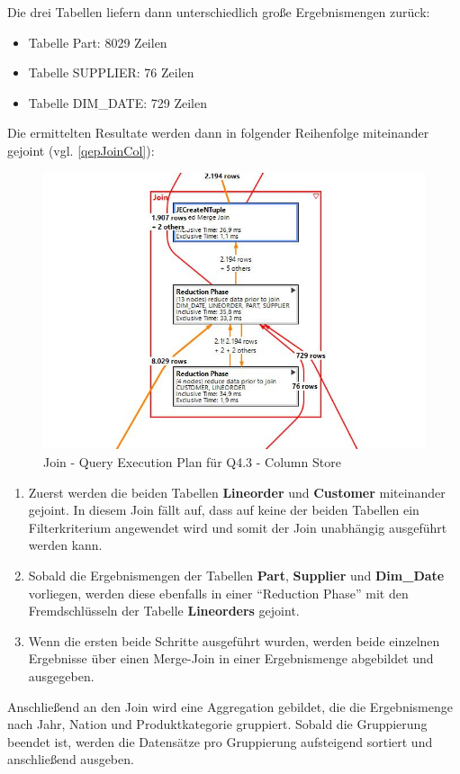 Die drei Tabellen liefern dann unterschiedlich große Ergebnismengen zurück:
\begin{itemize}
	\item Tabelle Part:			8029 Zeilen
	\item Tabelle SUPPLIER:		76 Zeilen
	\item Tabelle DIM\_DATE:	729 Zeilen
\end{itemize}
Die ermittelten Resultate werden dann in folgender Reihenfolge miteinander gejoint (vgl. \autoref{qepJoinCol}):
\begin{figure}
	\centering
	\includegraphics[scale=0.6]{images/colq43join}
	\caption{Join - Query Execution Plan für Q4.3 - Column Store \label{qepJoinCol} }
\end{figure}
\begin{enumerate}
	\item Zuerst werden die beiden Tabellen \textbf{Lineorder} und \textbf{Customer} miteinander gejoint. In diesem Join fällt auf, dass auf keine der beiden Tabellen ein Filterkriterium angewendet wird und somit der Join unabhängig ausgeführt werden kann. 
	\item Sobald die Ergebnismengen der Tabellen \textbf{Part}, \textbf{Supplier} und \textbf{Dim\_Date} vorliegen, werden diese ebenfalls in einer \enquote{Reduction Phase} mit den Fremdschlüsseln der Tabelle \textbf{Lineorders} gejoint. 
	\item Wenn die ersten beide Schritte ausgeführt wurden, werden beide einzelnen Ergebnisse über einen Merge-Join in einer Ergebnismenge abgebildet und ausgegeben. 
\end{enumerate}
Anschließend an den Join wird eine Aggregation gebildet, die die Ergebnismenge nach Jahr, Nation und Produktkategorie gruppiert. Sobald die Gruppierung beendet ist, werden die Datensätze pro Gruppierung aufsteigend sortiert und anschließend ausgeben.


